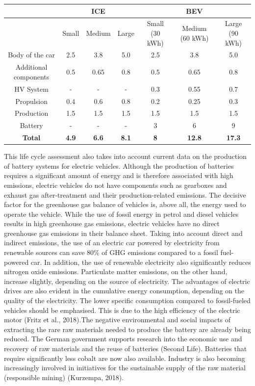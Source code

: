 \documentclass[
]{book}
\begin{document}
\begin{longtable}[]{@{}ccccccc@{}}
\toprule
& & ICE & & & BEV &\tabularnewline
\midrule
\endhead
& Small & Medium & Large & Small (30 kWh) & Medium (60 kWh) & Large (90 kWh)\tabularnewline
Body of the car & 2.5 & 3.8 & 5.0 & 2.5 & 3.8 & 5.0\tabularnewline
Additional components & 0.5 & 0.65 & 0.8 & 0.5 & 0.65 & 0.8\tabularnewline
HV System & - & - & - & 0.3 & 0.55 & 0.7\tabularnewline
Propulsion & 0.4 & 0.6 & 0.8 & 0.2 & 0.25 & 0.3\tabularnewline
Production & 1.5 & 1.5 & 1.5 & 1.5 & 1.5 & 1.5\tabularnewline
Battery & - & - & - & 3 & 6 & 9\tabularnewline
\textbf{Total} & \textbf{4.9} & \textbf{6.6} & \textbf{8.1} & \textbf{8} & \textbf{12.8} & \textbf{17.3}\tabularnewline
\bottomrule
\end{longtable}

This life cycle assessment also takes into account current data on the production of battery systems for electric vehicles. Although the production of batteries requires a significant amount of energy and is therefore associated with high emissions, electric vehicles do not have components such as gearboxes and exhaust gas after-treatment and their production-related emissions.
The decisive factor for the greenhouse gas balance of vehicles is, above all, the energy used to operate the vehicle. While the use of fossil energy in petrol and diesel vehicles results in high greenhouse gas emissions, electric vehicles have no direct greenhouse gas emissions in their balance sheet. Taking into account direct and indirect emissions, the use of an electric car powered by electricity from renewable sources can save 80\% of GHG emissions compared to a fossil fuel-powered car. In addition, the use of renewable electricity also significantly reduces nitrogen oxide emissions. Particulate matter emissions, on the other hand, increase slightly, depending on the source of electricity.
The advantages of electric drives are also evident in the cumulative energy consumption, depending on the quality of the electricity. The lower specific consumption compared to fossil-fueled vehicles should be emphasised. This is due to the high efficiency of the electric motor (Fritz et al., 2018).The negative environmental and social impacts of extracting the rare raw materials needed to produce the battery are already being reduced. The German government supports research into the economic use and recovery of raw materials and the reuse of batteries (Second Life). Batteries that require significantly less cobalt are now also available. Industry is also becoming increasingly involved in initiatives for the sustainable supply of the raw material (responsible mining) (Kurzempa, 2018).
\end{document}
